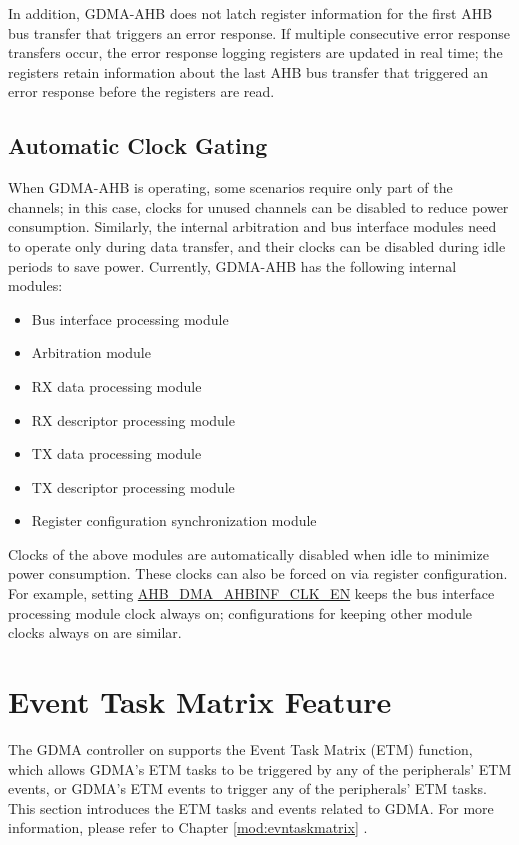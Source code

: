 \documentclass[main\_\_EN.tex]{subfiles}
\begin{document}
In addition, GDMA-AHB does not latch register information for the first AHB bus transfer that triggers an error response. If multiple consecutive error response transfers occur, the error response logging registers are updated in real time; the registers retain information about the last AHB bus transfer that triggered an error response before the registers are read.

\subsection{Automatic Clock Gating}\label{sec:dma-auto-clk-gating}

When GDMA-AHB is operating, some scenarios require only part of the channels; in this case, clocks for unused channels can be disabled to reduce power consumption. Similarly, the internal arbitration and bus interface modules need to operate only during data transfer, and their clocks can be disabled during idle periods to save power. Currently, GDMA-AHB has the following internal modules:
\begin{itemize}
    \item Bus interface processing module
    \item Arbitration module
    \item RX data processing module
    \item RX descriptor processing module
    \item TX data processing module
    \item TX descriptor processing module
    \item Register configuration synchronization module
\end{itemize}

Clocks of the above modules are automatically disabled when idle to minimize power consumption. These clocks can also be forced on via register configuration. For example, setting \hyperref[fielddesc:AHBDMAAHBINFCLKEN]{AHB\_DMA\_AHBINF\_CLK\_EN} keeps the bus interface processing module clock always on; configurations for keeping other module clocks always on are similar.

\section{Event Task Matrix Feature}\label{sec:dma-etm-func}

The GDMA controller on \chipname{} supports the Event Task Matrix (ETM) function, which allows GDMA's ETM tasks to be triggered by any of the peripherals' ETM events, or GDMA's ETM events to trigger any of the peripherals' ETM tasks. This section introduces the ETM tasks and events related to GDMA. For more information, please refer to Chapter \ref{mod:evntaskmatrix} .
\end{document}
